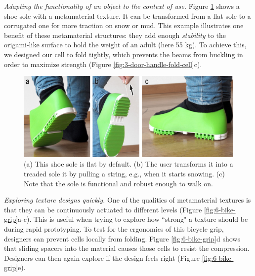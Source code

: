 \textit{Adapting the functionality of an object to the context of use. }
Figure \ref{fig:5-shoe-sole} shows a shoe sole with a metamaterial texture. It can be transformed from a flat sole to a corrugated one for more traction on snow or mud. This example illustrates one benefit of these metamaterial structures: they add enough \textit{stability} to the origami-like surface to hold the weight of an adult (here 55 kg). To achieve this, we designed our cell to fold tightly, which prevents the beams from buckling in order to maximize strength (Figure \ref{fig:3-door-handle-fold-cell}c). 

\begin{figure} [!h]  
    \includegraphics[width=\textwidth]{chapters/metamaterial-textures-FIG/5-shoe-sole.pdf}
    \caption[Short figure name.]{(a) This shoe sole is flat by default. (b) The user transforms it into a treaded sole it by pulling a string, e.g., when it starts snowing. (c) Note that the sole is functional and robust enough to walk on.
    \label{fig:5-shoe-sole}}
\end{figure}

\textit{Exploring texture designs quickly. }
One of the qualities of metamaterial textures is that they can be continuously actuated to different levels (Figure \ref{fig:6-bike-grip}a-c). This is useful when trying to explore how ``strong" a texture should be during rapid prototyping. To test for the ergonomics of this bicycle grip, designers can prevent cells locally from folding. Figure \ref{fig:6-bike-grip}d shows that sliding spacers into the material causes those cells to resist the compression. Designers can then again explore if the design feels right (Figure \ref{fig:6-bike-grip}e). 

